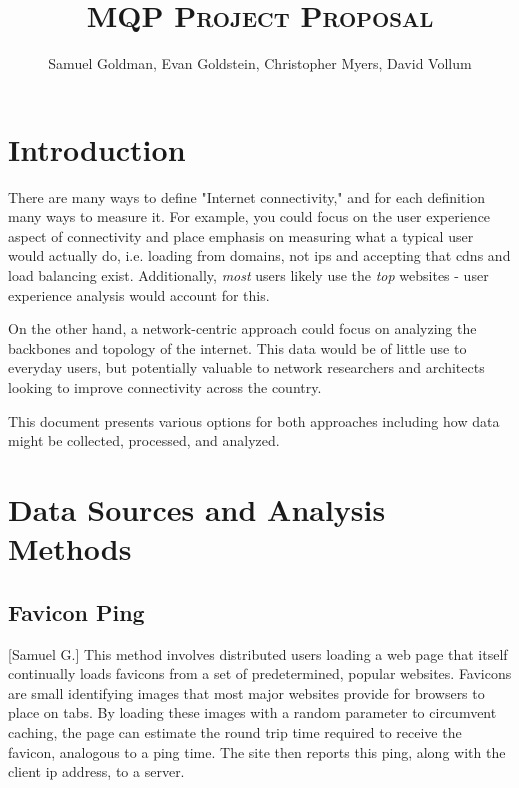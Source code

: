 \documentclass[12pt]{article}
\title{\scshape MQP Project Proposal}
\author{Samuel Goldman, Evan Goldstein, Christopher Myers, David Vollum}
\begin{document}
\maketitle
\newpage

\tableofcontents\newpage
\listoffigures
\newpage

\pagestyle{fancy}
\onehalfspacing

\section{Introduction}
There are many ways to define "Internet connectivity," and for each definition many ways to measure it. For example, you could focus on the user experience aspect of connectivity and place emphasis on measuring what a typical user would actually do, i.e. loading from domains, not \acrshort{ip}s and accepting that \acrfull{cdn}s and load balancing exist. Additionally, \textit{most} users likely use the \textit{top} websites - user experience analysis would account for this.

On the other hand, a network-centric approach could focus on analyzing the backbones and topology of the internet. This data would be of little use to everyday users, but potentially valuable to network researchers and architects looking to improve connectivity across the country.

This document presents various options for both approaches including how data might be collected, processed, and analyzed.

\newpage

\section{Data Sources and Analysis Methods}
\subsection{Favicon Ping}[Samuel G.]
This method involves distributed users loading a web page that itself continually loads favicons from a set of predetermined, popular websites. Favicons are small identifying images that most major websites provide for browsers to place on tabs. By loading these images with a random parameter to circumvent caching, the page can estimate the round trip time required to receive the favicon, analogous to a ping time. The site then reports this ping, along with the client \acrshort{ip} address, to a server.
\end{document}
